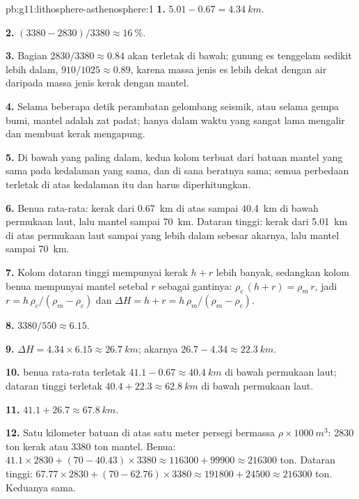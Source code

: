 \begin{solution}{pb:g11:lithosphere-asthenosphere:1}
\textbf{1.} $5.01 - 0.67 = \qty{4.34}{km}$.

\textbf{2.} $(3380 - 2830)/3380 \approx \qty{16}{\percent}$.

\textbf{3.} Bagian $2830/3380 \approx 0.84$ akan terletak di bawah; gunung es
tenggelam sedikit lebih dalam, $910/1025 \approx 0.89$, karena massa jenis es
lebih dekat dengan air daripada massa jenis kerak dengan mantel.

\textbf{4.} Selama beberapa detik perambatan gelombang seismik, atau selama
gempa bumi, mantel adalah zat padat; hanya dalam waktu yang sangat lama
 mengalir dan membuat kerak mengapung.

\textbf{5.} Di bawah  yang paling dalam, kedua kolom terbuat dari batuan
mantel yang sama pada kedalaman yang sama, dan di sana beratnya sama; semua
perbedaan terletak di atas kedalaman itu dan harus diperhitungkan.

\textbf{6.} Benua rata-rata: kerak dari \qty{0.67}{km} di atas sampai
\qty{40.4}{km} di bawah permukaan laut, lalu mantel sampai \qty{70}{km}. Dataran
tinggi: kerak dari \qty{5.01}{km} di atas permukaan laut sampai  yang lebih
dalam sebesar akarnya, lalu mantel sampai \qty{70}{km}.

\textbf{7.} Kolom dataran tinggi mempunyai kerak $h + r$ lebih banyak, sedangkan
kolom benua mempunyai mantel setebal $r$ sebagai gantinya: $\rho_c\,(h + r) = \rho_m\,r$,
jadi $r = h\,\rho_c/(\rho_m - \rho_c)$ dan $\Delta H = h + r =
h\,\rho_m/(\rho_m - \rho_c)$.

\textbf{8.} $3380/550 \approx 6.15$.

\textbf{9.} $\Delta H = 4.34 \times 6.15 \approx \qty{26.7}{km}$; akarnya
$26.7 - 4.34 \approx \qty{22.3}{km}$.

\textbf{10.}  benua rata-rata terletak $41.1 - 0.67 \approx
\qty{40.4}{km}$ di bawah permukaan laut;  dataran tinggi terletak $40.4 + 22.3 \approx
\qty{62.8}{km}$ di bawah permukaan laut.

\textbf{11.} $41.1 + 26.7 \approx \qty{67.8}{km}$.

\textbf{12.} Satu kilometer batuan di atas satu meter persegi bermassa
$\rho \times \qty{1000}{m^3}$: \num{2830} ton kerak atau \num{3380}
ton mantel. Benua: $41.1 \times 2830 + (70 - 40.43) \times 3380
\approx \num{116300} + \num{99900} \approx \num{216300}$ ton. Dataran tinggi:
$67.77 \times 2830 + (70 - 62.76) \times 3380 \approx \num{191800} +
\num{24500} \approx \num{216300}$ ton. Keduanya sama.


\end{solution}
